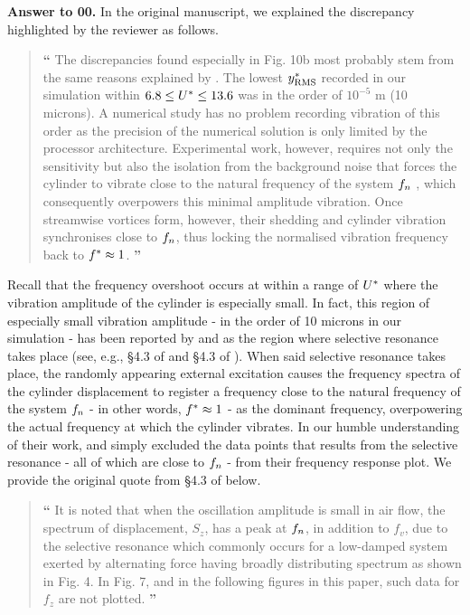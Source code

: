 \documentclass[12pt]{article}
\newcounter{question}
\newcommand{\name}{00}
\newcommand{\answer}[1]{\noindent \textbf{Answer to \name.\thequestion}\vskip 0.25cm \noindent #1 \mbox{}\\}
\begin{document}
\answer{
  In the original manuscript, we explained the discrepancy highlighted by the reviewer as follows.

  \begin{quotation}
    \hspace*{-1.3cm} {\Large \textbf{``}} The discrepancies found especially in Fig. 10b most probably stem from the same reasons explained by \citet{Nguyen2012}. The lowest  $y^{*}_{\text{RMS}}$ recorded in our simulation within  $6.8 \leq U^{*} \leq 13.6$ was in the order of $10^{-5}$ \si{\metre} (10 microns). A numerical study has no problem recording vibration of this order as the precision of the numerical solution is only limited by the processor architecture. Experimental work, however, requires not only the sensitivity but also the isolation from the background noise that forces the cylinder to vibrate close to the natural frequency of the system  $f_{n}$ \citep{Nguyen2012}, which consequently overpowers this minimal amplitude vibration. Once streamwise vortices form, however, their shedding and cylinder vibration synchronises close to $f_{n}$, thus locking the normalised vibration frequency back to  $f^{*} \approx 1$. {\Large \textbf{''}}
  \end{quotation}

  Recall that the frequency overshoot occurs at within a range of $U^{*}$ where the vibration amplitude of the cylinder is especially small. In fact, this region of especially small vibration amplitude - in the order of 10 microns in our simulation - has been reported by \citet{Nguyen2012} and \citet{Nguyen2010} as the region where selective resonance takes place (see, e.g., \S4.3 of \citet{Nguyen2010} and \S4.3 of \citet{Nguyen2012}). When said selective resonance takes place, the randomly appearing external excitation causes the frequency spectra of the cylinder displacement to register a frequency close to the natural frequency of the system $f_{n}$ - in other words, $f^{*} \approx 1$ - as the dominant frequency, overpowering the actual frequency at which the cylinder vibrates. In our humble understanding of their work, \citet{Nguyen2010} and \citet{Nguyen2012} simply excluded the data points that results from the selective resonance - all of which are close to $f_{n}$ - from their frequency response plot. We provide the original quote from \S4.3 of \citet{Nguyen2012} below.

  \begin{quotation}
    \hspace*{-1.3cm} {\Large \textbf{``}} It is noted that when the oscillation amplitude is small in air flow, the spectrum of displacement, $S_{z}$, has a peak at $f_{n}$, in addition to $f_{v}$, due to the selective resonance which commonly occurs for a low-damped system exerted by alternating force having broadly distributing spectrum as shown in Fig. 4. In Fig. 7, and in the following figures in this paper, such data for $f_{z}$ are not plotted. {\Large \textbf{''}}
  \end{quotation}

}
\end{document}
